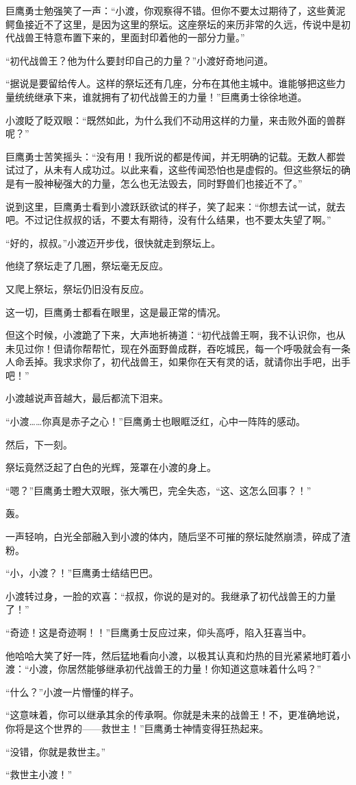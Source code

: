 \begin{this_body}
巨鹰勇士勉强笑了一声：“小渡，你观察得不错。但你不要太过期待了，这些黄泥鳄鱼接近不了这里，是因为这里的祭坛。这座祭坛的来历非常的久远，传说中是初代战兽王特意布置下来的，里面封印着他的一部分力量。”

“初代战兽王？他为什么要封印自己的力量？”小渡好奇地问道。

“据说是要留给传人。这样的祭坛还有几座，分布在其他主城中。谁能够把这些力量统统继承下来，谁就拥有了初代战兽王的力量！”巨鹰勇士徐徐地道。

小渡眨了眨双眼：“既然如此，为什么我们不动用这样的力量，来击败外面的兽群呢？”

巨鹰勇士苦笑摇头：“没有用！我所说的都是传闻，并无明确的记载。无数人都尝试过了，从未有人成功过。以此来看，这些传闻恐怕也是虚假的。但这些祭坛的确是有一股神秘强大的力量，怎么也无法毁去，同时野兽们也接近不了。”

说到这里，巨鹰勇士看到小渡跃跃欲试的样子，笑了起来：“你想去试一试，就去吧。不过记住叔叔的话，不要太有期待，没有什么结果，也不要太失望了啊。”

“好的，叔叔。”小渡迈开步伐，很快就走到祭坛上。

他绕了祭坛走了几圈，祭坛毫无反应。

又爬上祭坛，祭坛仍旧没有反应。

这一切，巨鹰勇士都看在眼里，这是最正常的情况。

但这个时候，小渡跪了下来，大声地祈祷道：“初代战兽王啊，我不认识你，也从未见过你！但请你帮帮忙，现在外面野兽成群，吞吃城民，每一个呼吸就会有一条人命丢掉。我求求你了，初代战兽王，如果你在天有灵的话，就请你出手吧，出手吧！”

小渡越说声音越大，最后都流下泪来。

“小渡……你真是赤子之心！”巨鹰勇士也眼眶泛红，心中一阵阵的感动。

然后，下一刻。

祭坛竟然泛起了白色的光辉，笼罩在小渡的身上。

“嗯？”巨鹰勇士瞪大双眼，张大嘴巴，完全失态，“这、这怎么回事？！”

轰。

一声轻响，白光全部融入到小渡的体内，随后坚不可摧的祭坛陡然崩溃，碎成了渣粉。

“小，小渡？！”巨鹰勇士结结巴巴。

小渡转过身，一脸的欢喜：“叔叔，你说的是对的。我继承了初代战兽王的力量了！”

“奇迹！这是奇迹啊！！”巨鹰勇士反应过来，仰头高呼，陷入狂喜当中。

他哈哈大笑了好一阵，然后猛地看向小渡，以极其认真和灼热的目光紧紧地盯着小渡：“小渡，你居然能够继承初代战兽王的力量！你知道这意味着什么吗？”

“什么？”小渡一片懵懂的样子。

“这意味着，你可以继承其余的传承啊。你就是未来的战兽王！不，更准确地说，你将是这个世界的——救世主！”巨鹰勇士神情变得狂热起来。

“没错，你就是救世主。”

“救世主小渡！”

\end{this_body}

